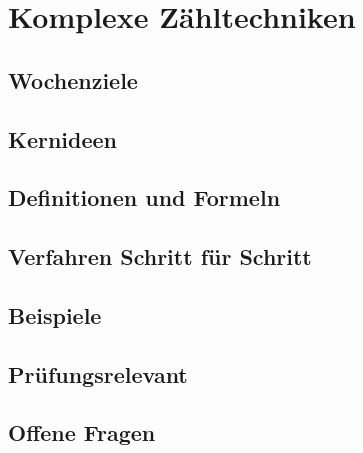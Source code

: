 \chapter{Komplexe Zähltechniken}
\label{kap:09-komplexe-zaehltechniken}

\section*{Wochenziele}
\begin{wochenziele}
\end{wochenziele}

\section{Kernideen}

\section{Definitionen und Formeln}

\section{Verfahren Schritt für Schritt}

\section{Beispiele}

\section{Prüfungsrelevant}

\section{Offene Fragen}
